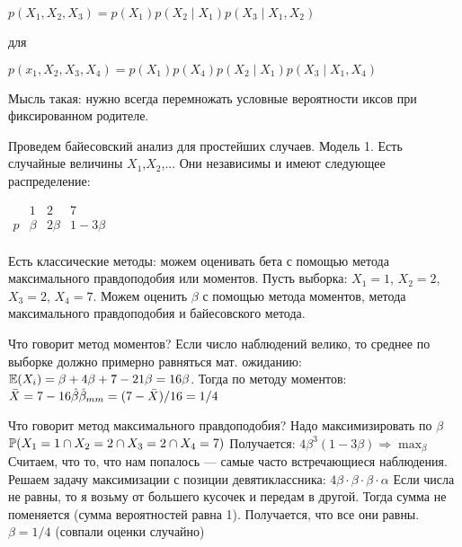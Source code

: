 $p(X_1,X_2,X_3)=p(X_1)p(X_2\mid X_1) p(X_3 \mid X_1,X_2)$

для



$p(x_1,X_2,X_3,X_4)=p(X_1)p(X_4)p(X_2\mid X_1)p(X_3\mid X_1,X_4)$

Мысль такая: нужно всегда  перемножать условные вероятности иксов при фиксированном родителе.



Проведем байесовский анализ для простейших случаев.
Модель 1. Есть случайные величины $X_1$,$X_2$,...
Они независимы и имеют следующее распределение:

$\begin{array}{c|ccc}
    {} &  1  & 2  & 7   \\
\hline
    {p} &  {\beta} & {2\beta} & {1-3\beta}   \\
\end{array}$

Есть классические методы: можем оценивать бета с помощью метода максимального правдоподобия или моментов. 
Пусть выборка: $X_1=1$, $X_2=2$, $X_3=2$, $X_4=7$.
Можем оценить  $\beta$ с помощью метода моментов, метода максимального правдоподобия и байесовского метода.


Что говорит метод моментов? 
Если число наблюдений велико, то среднее по выборке должно примерно равняться мат. ожиданию:
 $\E(X_i)=\beta+4\beta+7-21\beta=16\beta$. 
Тогда по методу моментов: $\bar{X}=7-16\hat{\beta}\\
\hat{\beta}_{mm}=(7-\bar{X})/16=1/4$

Что говорит метод максимального правдоподобия?
Надо максимизировать по $\beta$ $\P(X_1=1 \cap X_2=2 \cap X_3=2 \cap X_4=7)$
Получается: $4\beta^3(1-3\beta) \Rightarrow \max_{\beta}$
Считаем, что то, что нам попалось --- самые часто встречающиеся наблюдения.
Решаем задачу максимизации с позиции девятиклассника: $4\beta \cdot \beta \cdot \beta \cdot \alpha$
 Если числа не равны, то я возьму от большего кусочек и передам в другой. Тогда сумма не поменяется (сумма вероятностей равна 1). Получается, что все они равны. $\beta=1/4$ (совпали оценки случайно)

